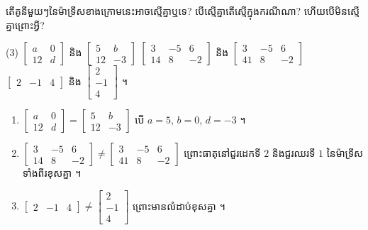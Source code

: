 \begin{example}[លំហាត់គំរូ ៣]
តើគូនីមួយៗនៃម៉ាទ្រីសខាងក្រោមនេះអាចស្មើគ្នាឬទេ? បើស្មើគ្នាតើស្មើក្នុងករណីណា? ហើយបើមិនស្មើគ្នាព្រោះអ្វី?
\begin{tasks}(3)
  \task $\begin{bmatrix} a & 0\\ 12 & d \end{bmatrix}$ និង $\begin{bmatrix} 5 & b\\ 12 & -3 \end{bmatrix}$
  \task $\begin{bmatrix} 3 & -5 & 6\\ 14 & 8 & -2 \end{bmatrix}$ និង $\begin{bmatrix} 3 & -5 & 6\\ 41 & 8 & -2 \end{bmatrix}$
  \task $\begin{bmatrix} 2 & -1 & 4 \end{bmatrix}$ និង $\begin{bmatrix} 2\\ -1\\ 4 \end{bmatrix}$ ។
\end{tasks}
\end{example}
\ans
\begin{enumerate}[a]
  \item $\begin{bmatrix} a & 0\\ 12 & d \end{bmatrix} = \begin{bmatrix} 5 & b\\ 12 & -3 \end{bmatrix}$ បើ $a = 5$, $b = 0$, $d = -3$ ។
  \item $\begin{bmatrix} 3 & -5 & 6\\ 14 & 8 & -2 \end{bmatrix} \ne \begin{bmatrix} 3 & -5 & 6\\ 41 & 8 & -2 \end{bmatrix}$ ព្រោះធាតុនៅជួរដេកទី $2$ និងជួរឈរទី $1$ នៃម៉ាទ្រីសទាំងពីរខុសគ្នា ។
  \item $\begin{bmatrix} 2 & -1 & 4 \end{bmatrix} \ne \begin{bmatrix} 2\\ -1\\ 4 \end{bmatrix}$ ព្រោះមានលំដាប់ខុសគ្នា ។
\end{enumerate}

